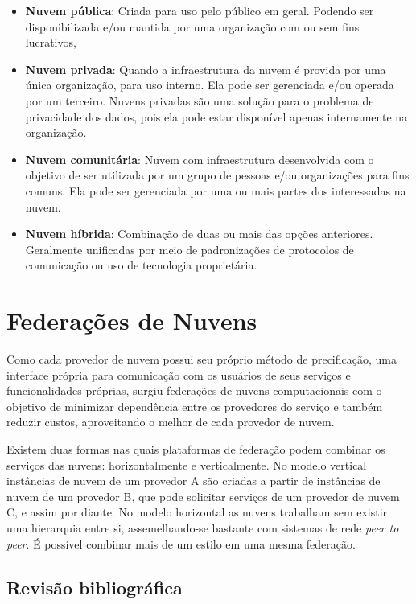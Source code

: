 \begin{itemize}
	\item \textbf{Nuvem pública}: Criada para uso pelo público em geral. Podendo ser disponibilizada e/ou mantida por uma organização com ou sem fins lucrativos, 
	\item \textbf{Nuvem privada}: Quando a infraestrutura da nuvem é provida por uma única organização, para uso interno. Ela pode ser gerenciada e/ou operada por um terceiro. Nuvens privadas são uma solução para o problema de privacidade dos dados, pois ela pode estar disponível apenas internamente na organização.
	\item \textbf{Nuvem comunitária}: Nuvem com infraestrutura desenvolvida com o objetivo de ser utilizada por um grupo de pessoas e/ou organizações para fins comuns. Ela pode ser gerenciada por uma ou mais partes dos interessadas na nuvem.
	\item \textbf{Nuvem híbrida}: Combinação de duas ou mais das opções anteriores. Geralmente unificadas por meio de padronizações de protocolos de comunicação ou uso de tecnologia proprietária.
\end{itemize}

\section{Federações de Nuvens}

Como cada provedor de nuvem possui seu próprio método de precificação, uma interface própria para comunicação com os usuários de seus serviços e funcionalidades próprias, surgiu federações de nuvens computacionais com o objetivo de minimizar dependência entre os provedores do serviço e também reduzir custos, aproveitando o melhor de cada provedor de nuvem.

Existem duas formas nas quais plataformas de federação podem combinar os serviços das nuvens: horizontalmente e verticalmente\cite{5557976}\cite{7835207}. No modelo vertical instâncias de nuvem de um provedor A são criadas a partir de instâncias de nuvem de um provedor B, que pode solicitar serviços de um provedor de nuvem C, e assim por diante. No modelo horizontal as nuvens trabalham sem existir uma hierarquia entre si, assemelhando-se bastante com sistemas de rede \textit{peer to peer}. É possível combinar mais de um estilo em uma mesma federação.

\subsection{Revisão bibliográfica}

